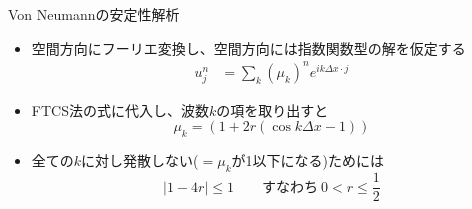 \begin{frame}[t]{Von Neumannの安定性解析}
  \begin{itemize}
  \item 空間方向にフーリエ変換し、空間方向には指数関数型の解を仮定する
    \begin{align*}
    u_j^n &= \sum_k (\mu_k)^n e^{ik\Delta x \cdot j}
    \end{align*}
  \item FTCS法の式に代入し、波数$k$の項を取り出すと
    \[
    \mu_k =  (1 + 2r(\cos k \Delta x - 1))
    \]
  \item 全ての$k$に対し発散しない(\(=\mu_k\)が1以下になる)ためには
    \[
      | 1 - 4r | \le 1 \qquad \text{すなわち} \ 0 < r \le \frac{1}{2}
    \]
  \end{itemize}
\end{frame}
